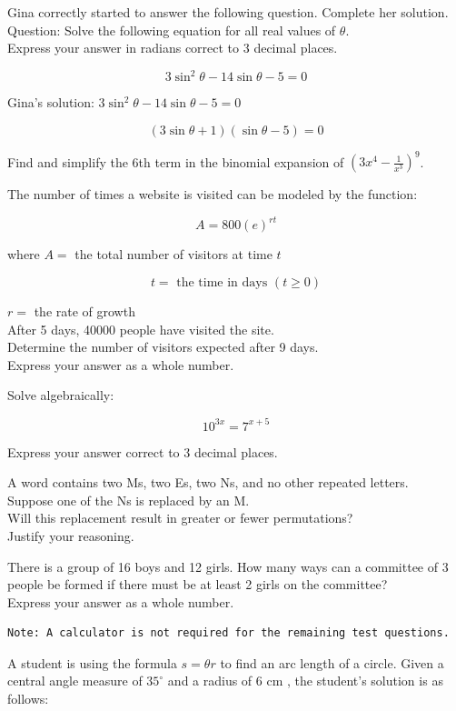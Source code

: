 \documentclass[10pt]{article}
\begin{document}
\captionsetup{singlelinecheck=false}
Gina correctly started to answer the following question. Complete her solution.\\
Question: Solve the following equation for all real values of $\theta$.\\
Express your answer in radians correct to 3 decimal places.

$$
3 \sin ^{2} \theta-14 \sin \theta-5=0
$$

Gina's solution: $3 \sin ^{2} \theta-14 \sin \theta-5=0$

$$
(3 \sin \theta+1)(\sin \theta-5)=0
$$

Find and simplify the 6th term in the binomial expansion of $\left(3 x^{4}-\frac{1}{x^{3}}\right)^{9}$.

The number of times a website is visited can be modeled by the function:

$$
A=800(e)^{r t}
$$

where $A=$ the total number of visitors at time $t$

$$
t=\text { the time in days }(t \geq 0)
$$

$r=$ the rate of growth\\
After 5 days, 40000 people have visited the site.\\
Determine the number of visitors expected after 9 days.\\
Express your answer as a whole number.

Solve algebraically:

$$
10^{3 x}=7^{x+5}
$$

Express your answer correct to 3 decimal places.

A word contains two Ms, two Es, two Ns, and no other repeated letters.\\
Suppose one of the Ns is replaced by an M.\\
Will this replacement result in greater or fewer permutations?\\
Justify your reasoning.

There is a group of 16 boys and 12 girls. How many ways can a committee of 3 people be formed if there must be at least 2 girls on the committee?\\
Express your answer as a whole number.

\begin{verbatim}
Note: A calculator is not required for the remaining test questions.
\end{verbatim}

A student is using the formula $s=\theta r$ to find an arc length of a circle. Given a central angle measure of $35^{\circ}$ and a radius of 6 cm , the student's solution is as follows:
\end{document}
